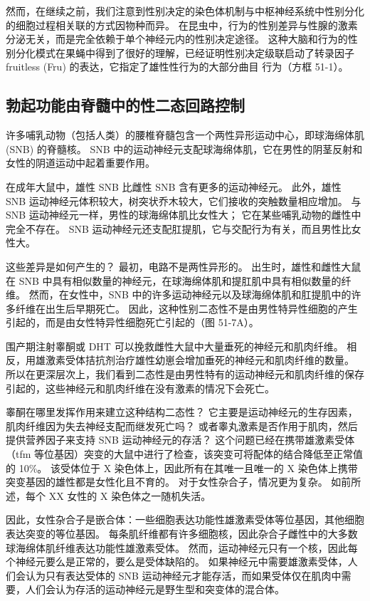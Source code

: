 然而，在继续之前，我们注意到性别决定的染色体机制与中枢神经系统中性别分化的细胞过程相关联的方式因物种而异。 在昆虫中，行为的性别差异与性腺的激素分泌无关，而是完全依赖于单个神经元内的性别决定途径。 这种大脑和行为的性别分化模式在果蝇中得到了很好的理解，已经证明性别决定级联启动了转录因子 fruitless (Fru) 的表达，它指定了雄性性行为的大部分曲目 行为（方框 51-1）。

\subsection{勃起功能由脊髓中的性二态回路控制}
许多哺乳动物（包括人类）的腰椎脊髓包含一个两性异形运动中心，即球海绵体肌 (SNB) 的脊髓核。 SNB 中的运动神经元支配球海绵体肌，它在男性的阴茎反射和女性的阴道运动中起着重要作用。

在成年大鼠中，雄性 SNB 比雌性 SNB 含有更多的运动神经元。 此外，雄性 SNB 运动神经元体积较大，树突状乔木较大，它们接收的突触数量相应增加。 与 SNB 运动神经元一样，男性的球海绵体肌比女性大； 它在某些哺乳动物的雌性中完全不存在。 SNB 运动神经元还支配肛提肌，它与交配行为有关，而且男性比女性大。


这些差异是如何产生的？ 最初，电路不是两性异形的。 出生时，雄性和雌性大鼠在 SNB 中具有相似数量的神经元，在球海绵体肌和提肛肌中具有相似数量的纤维。 然而，在女性中，SNB 中的许多运动神经元以及球海绵体肌和肛提肌中的许多纤维在出生后早期死亡。 因此，这种性别二态性不是由男性特异性细胞的产生引起的，而是由女性特异性细胞死亡引起的（图 51-7A）。

围产期注射睾酮或 DHT 可以挽救雌性大鼠中大量垂死的神经元和肌肉纤维。 相反，用雄激素受体拮抗剂治疗雄性幼崽会增加垂死的神经元和肌肉纤维的数量。 所以在更深层次上，我们看到二态性是由男性特有的运动神经元和肌肉纤维的保存引起的，这些神经元和肌肉纤维在没有激素的情况下会死亡。

睾酮在哪里发挥作用来建立这种结构二态性？ 它主要是运动神经元的生存因素，肌肉纤维因为失去神经支配而继发死亡吗？ 或者睾丸激素是否作用于肌肉，然后提供营养因子来支持 SNB 运动神经元的存活？ 这个问题已经在携带雄激素受体（tfm 等位基因）突变的大鼠中进行了检查，该突变可将配体的结合降低至正常值的 10\%。 该受体位于 X 染色体上，因此所有在其唯一且唯一的 X 染色体上携带突变基因的雄性都是女性化且不育的。 对于女性杂合子，情况更为复杂。 如前所述，每个 XX 女性的 X 染色体之一随机失活。

因此，女性杂合子是嵌合体：一些细胞表达功能性雄激素受体等位基因，其他细胞表达突变的等位基因。 每条肌纤维都有许多细胞核，因此杂合子雌性中的大多数球海绵体肌纤维表达功能性雄激素受体。 然而，运动神经元只有一个核，因此每个神经元要么是正常的，要么是受体缺陷的。 如果神经元中需要雄激素受体，人们会认为只有表达受体的 SNB 运动神经元才能存活，而如果受体仅在肌肉中需要，人们会认为存活的运动神经元是野生型和突变体的混合体。

